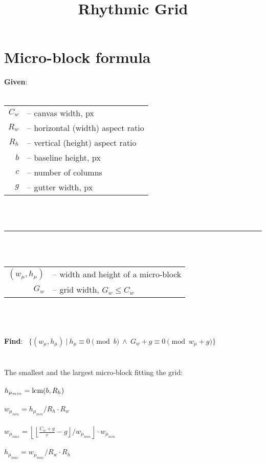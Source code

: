 \documentclass[12pt]{article}
\title{Rhythmic Grid}
\date{}
\begin{document}
\maketitle

\section*{Micro-block formula}
\textbf{Given}: \\ \\
\begin{tabular}{r l}
$C_w$ & -- canvas width, px \\ 
$R_w$ & -- horizontal (width) aspect ratio \\
$R_h$ & -- vertical (height) aspect ratio \\
$b$ & -- baseline height, px \\ 
$c$ & -- number of columns \\
$g$ & -- gutter width, px \\
\end{tabular} \\ \\
\noindent\rule{15cm}{0.4pt} \\ \\
\begin{tabular}{r l}
$(w_\mu, h_\mu)$ & -- width and height of a micro-block \\
$G_w$ & -- grid width, $G_w \leq C_w$ \\
\end{tabular} \\ \\ \\
\textbf{Find}: \ $\{\left( w_{\mu}, h_{\mu} \right) \ | \ h_\mu \equiv 0\pmod{b}  \ \land \  G_w+g \equiv 0\pmod{w_\mu + g}  \}$  \\ \\
\\
The smallest and the largest micro-block fitting the grid:\\ \\
$h_{\mu_{min}} = \textup{lcm} (b, R_h)$ \\ \\
$w_{\mu_{min}} = h_{\mu_{min}} / R_h \cdot R_w$ \\ \\
$w_{\mu_{max}} = \left \lfloor \left \lfloor \frac{C_w+g}{c} -g \right \rfloor /  w_{\mu_{min}} \right \rfloor \cdot w_{\mu_{min}}$ \\ \\
$h_{\mu_{max}} = w_{\mu_{max}} / R_w \cdot R_h$ \\
\end{document}
